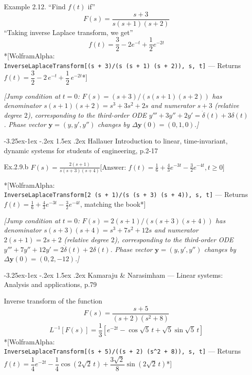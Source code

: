 \documentclass[
  11pt,
]{article}
\makeatletter
\renewcommand\paragraph{\@startsection{paragraph}{4}{\z@}%
                                     {-3.25ex\@plus -1ex \@minus -.2ex}%
                                     {1.5ex \@plus .2ex}%
                                     {\normalfont\normalsize\bfseries}}
\makeatother
\begin{document}
Example 2.12. ``Find \(f(t)\) if'' \[
F(s) = \frac{s+3}{s(s+1)(s+2)}
\] ``Taking inverse Laplace transform, we get'' \[
f(t) = \frac{3}{2} - 2e^{-t} + \frac{1}{2}e^{-2t}
\] *{[}WolframAlpha:
\texttt{InverseLaplaceTransform{[}(s\ +\ 3)/(s\ (s\ +\ 1)\ (s\ +\ 2)),\ s,\ t{]}}
--- Returns \(f(t) = \dfrac32 - 2\,e^{-t} + \dfrac12\,e^{-2t}\)*{]}

\emph{{[}Jump condition at \(t=0\): \(F(s)=(s+3)/(s(s+1)(s+2))\) has
denominator \(s(s+1)(s+2)=s^3+3s^2+2s\) and numerator \(s+3\) (relative
degree \(2\)), corresponding to the third-order ODE
\(y'''+3y''+2y'=\dot\delta(t)+3\delta(t)\). Phase vector
\(\mathbf y=(y,y',y'')\) changes by \(\Delta\mathbf y(0)=(0,1,0)\).{]}}

\hypertarget{hallauer-introduction-to-linear-time-invariant-dynamic-systems-for-students-of-engineering-p.2-17-1}{%
\paragraph{Hallauer Introduction to linear, time-invariant, dynamic
systems for students of engineering,
p.2-17}\label{hallauer-introduction-to-linear-time-invariant-dynamic-systems-for-students-of-engineering-p.2-17-1}}

Ex.2.9.b
\(F(s) = \frac{2(s+1)}{s(s+3)(s+4)} \text{[Answer: } f(t) = \frac{1}{6} + \frac{4}{3} e^{-3t} - \frac{3}{2} e^{-4t}, t \geq 0 \text{]}\)

*{[}WolframAlpha:
\texttt{InverseLaplaceTransform{[}2\ (s\ +\ 1)/(s\ (s\ +\ 3)\ (s\ +\ 4)),\ s,\ t{]}}
--- Returns \(f(t) = \frac16 + \frac43 e^{-3t} - \frac32 e^{-4t}\),
matching the book*{]}

\emph{{[}Jump condition at \(t=0\): \(F(s)=2(s+1)/(s(s+3)(s+4))\) has
denominator \(s(s+3)(s+4)=s^3+7s^2+12s\) and numerator \(2(s+1)=2s+2\)
(relative degree \(2\)), corresponding to the third-order ODE
\(y'''+7y''+12y'=2\dot\delta(t)+2\delta(t)\). Phase vector
\(\mathbf y=(y,y',y'')\) changes by
\(\Delta\mathbf y(0)=(0,2,-12)\).{]}}

\hypertarget{kamaraju-narasimham-linear-systems-analysis-and-applications-p.79}{%
\paragraph{Kamaraju \& Narasimham --- Linear systems: Analysis and
applications,
p.79}\label{kamaraju-narasimham-linear-systems-analysis-and-applications-p.79}}

Inverse transform of the function \[
F(s) = \frac{s + 5}{(s + 2)(s^2 + 8)}
\] \[
L^{-1}[F(s)] = \frac{1}{3} \left[ e^{-2t} - \cos\sqrt{5}\,t + \sqrt{5}\sin\sqrt{5}\,t \right]
\] *{[}WolframAlpha:
\texttt{InverseLaplaceTransform{[}(s\ +\ 5)/((s\ +\ 2)\ (s\^{}2\ +\ 8)),\ s,\ t{]}}
--- Returns
\(f(t) = \dfrac14 e^{-2t} - \dfrac14\cos(2\sqrt2\,t) + \dfrac{3\sqrt2}{8}\sin(2\sqrt2\,t)\)*{]}
\end{document}
